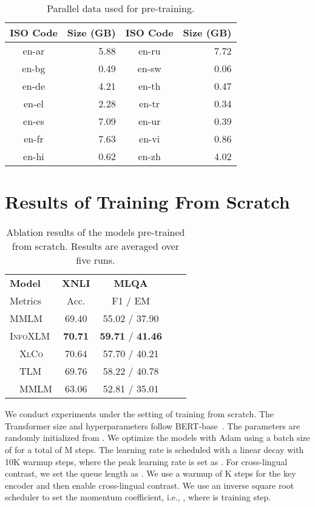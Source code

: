 \documentclass[11pt,a4paper]{article}
\newcommand\our{\textsc{InfoXLM}}
\newcommand\xlco{\textsc{XlCo}}
\begin{document}
\begin{table}[ht]
\centering
\scriptsize
\begin{tabular}{crcr}
\toprule
ISO Code & Size (GB) & ISO Code & Size (GB) \\ \midrule
en-ar & 5.88 & en-ru & 7.72 \\
en-bg & 0.49 & en-sw & 0.06 \\
en-de & 4.21 & en-th & 0.47 \\
en-el & 2.28 & en-tr & 0.34 \\
en-es & 7.09 & en-ur & 0.39 \\
en-fr & 7.63 & en-vi & 0.86 \\
en-hi & 0.62 & en-zh & 4.02 \\
\bottomrule
\end{tabular}
\caption{Parallel data used for pre-training.}
\label{table:parallel:data}
\end{table}


\section{Results of Training From Scratch}
\label{sec:from:scratch}

\begin{table}[t]
\centering
\small
\begin{tabular}{lcccc}
\toprule
\textbf{Model} & \textbf{XNLI} & \textbf{MLQA} \\
Metrics & Acc. & F1 / EM \\ \midrule
MMLM & 69.40 & 55.02 / 37.90 \\
\our{} & \textbf{70.71} & \textbf{59.71} / \textbf{41.46} \\
~~\xlco{} & 70.64 & 57.70 / 40.21 \\
~~TLM & 69.76 & 58.22 / 40.78 \\ 
~~MMLM & 63.06 & 52.81 / 35.01 \\ 
\bottomrule
\end{tabular}
\caption{Ablation results of the models pre-trained from scratch. Results are averaged over five runs.}
\label{table:fs-results}
\end{table}

We conduct experiments under the setting of training from scratch.
The Transformer size and hyperparameters follow BERT-base~\cite{bert}.
The parameters are randomly initialized from .
We optimize the models with Adam using a batch size of  for a total of M steps. The learning rate is scheduled with a linear decay with 10K warmup steps, where the peak learning rate is set as .
For cross-lingual contrast, we set the queue length as .
We use a warmup of K steps for the key encoder and then enable cross-lingual contrast.
We use an inverse square root scheduler to set the momentum coefficient, i.e., , where  is training step.
\end{document}

